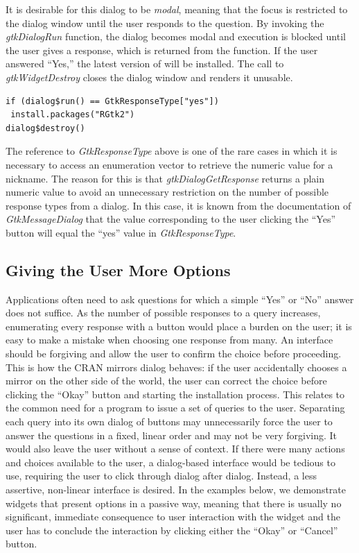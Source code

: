 \documentclass[article]{jss}
\begin{document}
It is desirable for this dialog to be \emph{modal}, meaning that the focus
is restricted to the dialog window until the user responds to the question. By
invoking the \emph{gtkDialogRun} function, the dialog becomes modal and execution
is blocked until the user gives a response, which is returned from the function.
If the user answered ``Yes,'' the latest version of  will be 
installed. The call to \emph{gtkWidgetDestroy} closes the dialog window and 
renders it unusable.
\begin{verbatim}
if (dialog$run() == GtkResponseType["yes"])
 install.packages("RGtk2")
dialog$destroy()
\end{verbatim}
The reference to \emph{GtkResponseType} above is one of the rare cases in which
it is necessary to access an enumeration vector to retrieve the numeric value
for a nickname. The reason for this is that \emph{gtkDialogGetResponse} returns
a plain numeric value to avoid an unnecessary restriction on the number of 
possible response types from a dialog. In this case, it is known from
the documentation of \emph{GtkMessageDialog} that the value corresponding to
the user clicking the ``Yes'' button will equal the ``yes'' value in \emph{GtkResponseType}.

\subsection{Giving the User More Options}

Applications often need to ask questions for which a simple ``Yes'' or
``No'' answer does not suffice. As the number of possible responses to
a query increases, enumerating every response with a button would
place a burden on the user; it is easy to make a mistake when choosing
one response from many. An interface should be forgiving and allow the
user to confirm the choice before proceeding.  This is how the CRAN
mirrors dialog behaves: if the user accidentally chooses a mirror on
the other side of the world, the user can correct the choice before
clicking the ``Okay'' button and starting the installation
process. This relates to the common need for a program to issue a set
of queries to the user. Separating each query into its own dialog of
buttons may unnecessarily force the user to answer the questions in a
fixed, linear order and may not be very forgiving. It would also leave
the user without a sense of context. If there were many actions and
choices available to the user, a dialog-based interface would be
tedious to use, requiring the user to click through dialog after
dialog. Instead, a less assertive, non-linear interface is desired. In
the examples below, we demonstrate widgets that present options in a
passive way, meaning that there is usually no significant, immediate
consequence to user interaction with the widget and the user has to
conclude the interaction by clicking either the ``Okay'' or ``Cancel''
button.
\end{document}
